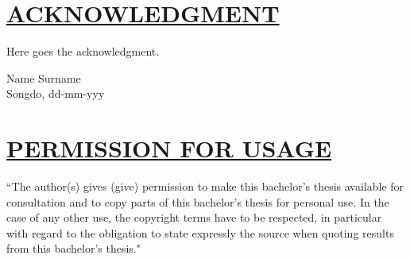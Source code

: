 \documentclass{article}
\begin{document}
{{{{{{{%
\section*{\uline{ACKNOWLEDGMENT}}
Here goes the acknowledgment.
\begin{flushright}
Name Surname\\
Songdo, dd-mm-yyy
\end{flushright}
\pagebreak

\section*{\uline{PERMISSION FOR USAGE}}
``The author(s) gives (give) permission to make this bachelor's thesis available for consultation and to copy parts of this bachelor's thesis for personal use. In the case of any other use, the copyright terms have to be respected, in particular with regard to the obligation to state expressly the source when quoting results from this bachelor's thesis."\\

\vspace*{1cm}
\\

\vspace*{1cm}
\\

}}}}}}}
\end{document}
